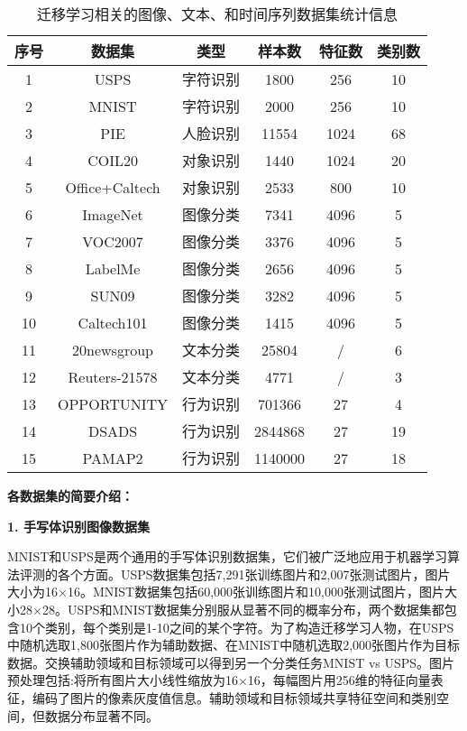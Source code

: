 \begin{table}[htbp]
	\centering
	\caption{迁移学习相关的图像、文本、和时间序列数据集统计信息}
	\label{tb-dataset}
	\begin{tabular}{|c|c|c|c|c|c|}
		\hline
		\textbf{序号} & \textbf{数据集} & \textbf{类型} & \textbf{样本数} & \textbf{特征数} & \textbf{类别数} \\ \hline \hline
		1 & USPS & 字符识别 & 1800 & 256 & 10 \\ \hline
		2 & MNIST & 字符识别 & 2000 & 256 & 10 \\ \hline
		3 & PIE & 人脸识别 & 11554 & 1024 & 68 \\ \hline
		4 & COIL20 & 对象识别 & 1440 & 1024 & 20 \\ \hline
		5 & Office+Caltech & 对象识别 & 2533 & 800 & 10 \\ \hline
		6 & ImageNet & 图像分类 & 7341 & 4096 & 5 \\ \hline
		7 & VOC2007 & 图像分类 & 3376 & 4096 & 5 \\ \hline
		8 & LabelMe & 图像分类 & 2656 & 4096 & 5 \\ \hline
		9 & SUN09 & 图像分类 & 3282 & 4096 & 5 \\ \hline
		10 & Caltech101 & 图像分类 & 1415 & 4096 & 5 \\ \hline
		11 & 20newsgroup & 文本分类 & 25804 & / & 6 \\ \hline
		12 & Reuters-21578 & 文本分类 & 4771 & / & 3 \\ \hline
		13 & OPPORTUNITY & 行为识别 & 701366 & 27 & 4 \\ \hline
		14 & DSADS & 行为识别 & 2844868 & 27 & 19 \\ \hline
		15 & PAMAP2 & 行为识别 & 1140000 & 27 & 18 \\ \hline
	\end{tabular}
\end{table}

\textbf{各数据集的简要介绍：}

\textbf{1. 手写体识别图像数据集}

MNIST和USPS是两个通用的手写体识别数据集，它们被广泛地应用于机器学习算法评测的各个方面。USPS数据集包括7,291张训练图片和2,007张测试图片，图片大小为16$\times$16。MNIST数据集包括60,000张训练图片和10,000张测试图片，图片大小28$\times$28。USPS和MNIST数据集分别服从显著不同的概率分布，两个数据集都包含10个类别，每个类别是1-10之间的某个字符。为了构造迁移学习人物，在USPS中随机选取1,800张图片作为辅助数据、在MNIST中随机选取2,000张图片作为目标数据。交换辅助领域和目标领域可以得到另一个分类任务MNIST vs USPS。图片预处理包括:将所有图片大小线性缩放为16$\times$16，每幅图片用256维的特征向量表征，编码了图片的像素灰度值信息。辅助领域和目标领域共享特征空间和类别空间，但数据分布显著不同。


